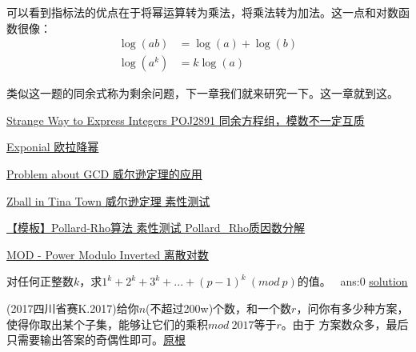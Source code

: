 可以看到指标法的优点在于将{\heiti 幂运算转为乘法，将乘法转为加法}。这一点和对数函数很像：
$$
\begin{aligned} \log (a b) &=\log (a)+\log (b) \\ \log \left(a^{k}\right) &=k \log (a) \end{aligned}
$$

类似这一题的同余式称为剩余问题，下一章我们就来研究一下。这一章就到这。


\vbox{}

\vbox{}

\begin{problemset}
	\item \href{http://poj.org/problem?id=2891}{Strange Way to Express Integers \quad POJ2891 \quad 同余方程组，模数不一定互质}  
	\item \href{https://cn.vjudge.net/problem/Gym-101550E#}{Exponial \quad 欧拉降幂}
	\item \href{http://acm.hdu.edu.cn/showproblem.php?pid=4910}{Problem about GCD \quad 威尔逊定理的应用}
	\item \href{https://vjudge.net/problem/HDU-5391}{Zball in Tina Town \quad 威尔逊定理 \quad 素性测试}
	\item \href{https://www.luogu.org/problem/P4718}{【模板】Pollard-Rho算法 \quad 素性测试 \quad Pollard\_Rho质因数分解 \label{prob:pollard}}
	\item \href{https://www.spoj.com/problems/MOD/}{MOD - Power Modulo Inverted \quad 离散对数}
	\item 对任何正整数$k$，求$1^k+2^k+3^k+...+(p-1)^k\ (mod\ p)$的值。 \  ans:0 \href{https://math.stackexchange.com/questions/1049420/for-any-positive-number-k-find-the-value-of-1k-2k-3k-p-1kmod?r=SearchResults#}{solution}
	\item (2017四川省赛K.2017)给你$n$(不超过200w)个数，和一个数$r$，问你有多少种方案，使得你取出某个子集，能够让它们的乘积$mod \ 2017$等于$r$。由于
	方案数众多，最后只需要输出答案的奇偶性即可。\href{https://www.cnblogs.com/autsky-jadek/p/7496328.html}{\quad 原根}
\end{problemset}

